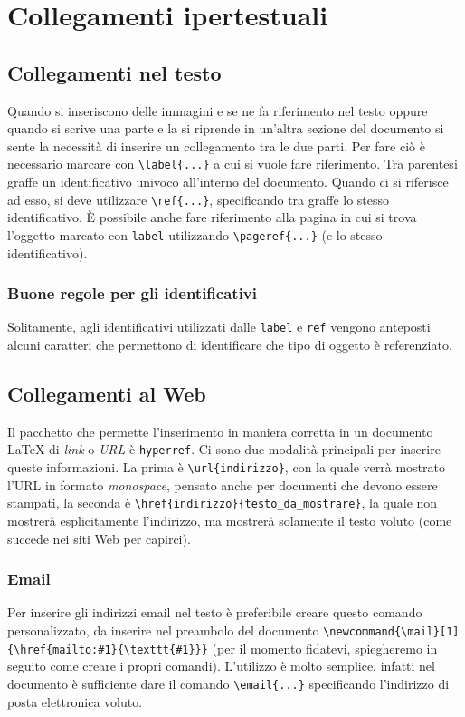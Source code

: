 \section{Collegamenti ipertestuali}

\subsection{Collegamenti nel testo}
Quando si inseriscono delle immagini e se ne fa riferimento nel testo oppure quando si scrive una parte e la si riprende in un'altra sezione del documento si sente la necessità di inserire un collegamento tra le due parti. Per fare ciò è necessario marcare con \verb!\label{...}! a cui si vuole fare riferimento. Tra parentesi graffe un identificativo univoco all'interno del documento. Quando ci si riferisce ad esso, si deve utilizzare \verb!\ref{...}!, specificando tra graffe lo stesso identificativo. È possibile anche fare riferimento alla pagina in cui si trova l'oggetto marcato con \verb!label! utilizzando \verb!\pageref{...}! (e lo stesso identificativo).

\subsubsection{Buone regole per gli identificativi}
Solitamente, agli identificativi utilizzati dalle \verb!label! e \verb!ref! vengono anteposti alcuni caratteri che permettono di identificare che tipo di oggetto è referenziato. 

\subsection{Collegamenti al Web}
Il pacchetto che permette l'inserimento in maniera corretta in un documento \LaTeX{} di \textit{link} o \textit{URL} è \verb!hyperref!. Ci sono due modalità principali per inserire queste informazioni. La prima è \verb!\url{indirizzo}!, con la quale verrà mostrato l'URL in formato \textit{monospace}, pensato anche per documenti che devono essere stampati, la seconda è \verb!\href{indirizzo}{testo_da_mostrare}!, la quale non mostrerà esplicitamente l'indirizzo, ma mostrerà solamente il testo voluto (come succede nei siti Web per capirci). 

\subsubsection{Email}
Per inserire gli indirizzi email nel testo è preferibile creare questo comando personalizzato, da inserire nel preambolo del documento \verb!\newcommand{\mail}[1]{\href{mailto:#1}{\texttt{#1}}}! (per il momento fidatevi, spiegheremo in seguito come creare i propri comandi). L'utilizzo è molto semplice, infatti nel documento è sufficiente dare il comando \verb!\email{...}! specificando l'indirizzo di posta elettronica voluto.

